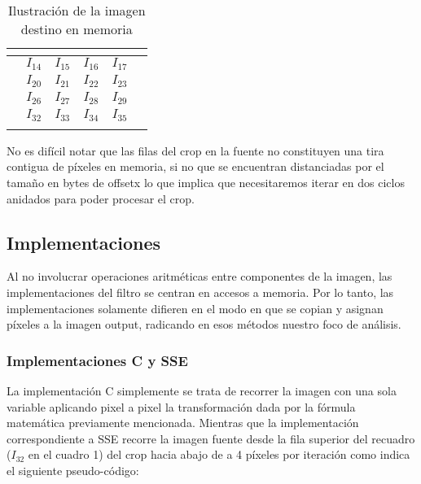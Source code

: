 \begin{table}[h]
\centering
\mem
\begin{tabular}{l|c|c|c|c|l}
& \multicolumn{1}{l|}{}       & \multicolumn{1}{l|}{}   & \multicolumn{1}{l|}{}     & \multicolumn{1}{l|}{}      &  \\ \hline
 & \cellcolor[HTML]{FD6864}$I_{14}$ & \cellcolor[HTML]{FD6864}$I_{15}$ & \cellcolor[HTML]{FD6864}$I_{16}$  & \cellcolor[HTML]{FD6864}$I_{17}$ &  \\ \hline
 & \cellcolor[HTML]{FD6864}$I_{20}$ & \cellcolor[HTML]{FD6864}$I_{21}$ & \cellcolor[HTML]{FD6864}$I_{22}$  & \cellcolor[HTML]{FD6864}$I_{23}$ &  \\ \hline 
 & \cellcolor[HTML]{FD6864}$I_{26}$  & \cellcolor[HTML]{FD6864}$I_{27}$  & \cellcolor[HTML]{FD6864}$I_{28}$  & \cellcolor[HTML]{FD6864}$I_{29}$ &  \\ \hline
  & \cellcolor[HTML]{FD6864}$I_{32}$ & \cellcolor[HTML]{FD6864}$I_{33}$  & \cellcolor[HTML]{FD6864}$I_{34}$  & \cellcolor[HTML]{FD6864}$I_{35}$ &  \\ \hline
  & \multicolumn{1}{l|}{}       & \multicolumn{1}{l|}{}  & \multicolumn{1}{l|}{}      & \multicolumn{1}{l|}{}      &
\end{tabular}
\caption{Ilustración de la imagen destino en memoria}
\end{table}




No es difícil notar que las filas del crop en la fuente no constituyen una tira contigua de píxeles en memoria, si no que se encuentran distanciadas por el tamaño en bytes de offsetx lo que implica que necesitaremos iterar en dos ciclos anidados para poder procesar el crop.

\subsection{Implementaciones}
Al no involucrar operaciones aritméticas entre componentes de la imagen, las implementaciones del filtro se centran en accesos a memoria. Por lo tanto, las implementaciones solamente difieren en el modo en que se copian y asignan píxeles a la imagen output, radicando en esos métodos nuestro foco de análisis. 
\subsubsection{Implementaciones C y SSE}
La implementación C simplemente se trata de recorrer la imagen con una sola variable aplicando pixel a pixel la transformación dada por la fórmula matemática previamente mencionada. Mientras que la implementación correspondiente a SSE recorre la imagen fuente desde la fila superior del recuadro ($I_{32}$ en el cuadro 1) del crop hacia abajo de a 4 píxeles por iteración como indica el siguiente pseudo-código: 


